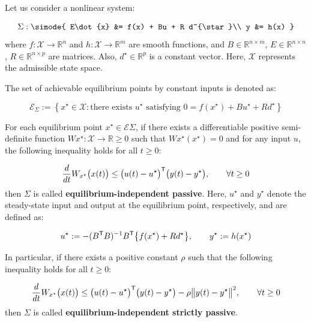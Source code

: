 \documentclass[graybox, envcountchap]{svmult}
\begin{document}
\begin{definition}\label{def:eipassive}
Let us consider a nonlinear system:

\begin{equation}\label{eq:nlsig}
  \Sigma: \simode{
  E\dot{x} &= f(x) + Bu + R d^{\star}\\
  y &= h(x)
  }
\end{equation}
where $f:\mathcal{X} \rightarrow \mathbb{R}^{n}$ and $h:\mathcal{X} \rightarrow
\mathbb{R}^{m}$ are smooth functions, and $B \in \mathbb{R}^{n\times m}$, $E \in
\mathbb{R}^{n\times n}$, $R \in \mathbb{R}^{n\times p}$ are matrices. Also,
$d^{\star}\in \mathbb{R}^p$ is a constant vector. Here, $\mathcal{X}$ represents
the admissible state space.

The set of achievable equilibrium points by constant inputs is denoted as:

\begin{equation*}%
  \mathcal{E}_{\Sigma} :=
  \left\{
  x^{\star} \in \mathcal{X}: 
  \mbox{there exists $u^{\star}$ satisfying $0 = f(x^{\star})+B u^{\star}+ R d^{\star}$}
  \right\}
\end{equation*}

For each equilibrium point $x^{\star} \in \mathcal{E}{\Sigma}$, if there exists
a differentiable positive semi-definite function $W{x^{\star}}:\mathcal{X}
\rightarrow \mathbb{R}{\geq 0}$ such that $W{x^{\star}} (x^{\star}) = 0$ and for
any input $u$, the following inequality holds for all $t \geq 0$:

\begin{equation*}%
  \frac{d}{dt} W_{x^{\star}} \bigl( x(t) \bigr) \leq \bigl(u(t)-u^{\star}\bigr)^{\sf T} \bigl(y(t)-y^{\star}\bigr)
  ,\qquad
  \forall t \geq 0
\end{equation*}
then $\Sigma$ is called \textbf{equilibrium-independent passive}. Here,
$u^{\star}$ and $y^{\star}$ denote the steady-state input and output at the
equilibrium point, respectively, and are defined as:

\begin{equation*}%
  u^{\star} := -(B^{\sf T}B)^{-1}B^{\sf T} \bigl\{f(x^{\star}) + R d^{\star} \bigr\}
  ,\qquad
  y^{\star} := h(x^{\star}) 
\end{equation*}

In particular, if there exists a positive constant $\rho$ such that the
following inequality holds for all $t \geq 0$:

\begin{equation*}%
  \frac{d}{dt} W_{x^{\star}} \bigl( x(t) \bigr) \leq \bigl(u(t)-u^{\star}\bigr)^{\sf T} \bigl(y(t)-y^{\star}\bigr)
  -\rho \bigl\|y(t)-y^{\star} \bigr\|^2
  ,\qquad
  \forall t \geq 0
\end{equation*}
then $\Sigma$ is called \textbf{equilibrium-independent strictly passive}.
\end{definition}
\end{document}
